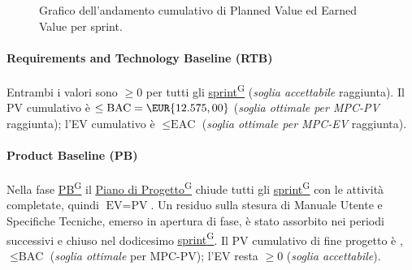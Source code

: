 \documentclass[a4paper,12pt]{article}
\providecommand{\glslink}[2]{\href{https://alittlebyte-19.github.io/Documentazione/glossario.html\#gls-#1}{\underline{#2}\textsuperscript{\scriptsize G}}}
\begin{document}
\begin{figure}[H]
\centering
{}
\caption{Grafico dell'andamento cumulativo di Planned Value ed Earned Value per sprint.}
\end{figure}

\paragraph*{Requirements and Technology Baseline (RTB)} Entrambi i valori sono $\geq 0$ per tutti gli \glslink{sprint}{sprint} (\emph{soglia accettabile} raggiunta). Il PV cumulativo è $\leq \text{BAC} = \EUR{12.575,00}$ (\emph{soglia ottimale per MPC-PV} raggiunta); l'EV cumulativo è $\leq \text{EAC}$ (\emph{soglia ottimale per MPC-EV} raggiunta).

\paragraph*{Product Baseline (PB)} Nella fase \glslink{pb-product-baseline}{PB} il \glslink{piano-di-progetto}{Piano di Progetto} chiude tutti gli \glslink{sprint}{sprint} con le attività completate, quindi $\text{EV} = \text{PV}$. Un residuo sulla stesura di Manuale Utente e Specifiche Tecniche, emerso in apertura di fase, è stato assorbito nei periodi successivi e chiuso nel dodicesimo \glslink{sprint}{sprint}. Il PV cumulativo di fine progetto è , $\leq \text{BAC}$ (\emph{soglia ottimale} per MPC-PV); l'EV resta $\geq 0$ (\emph{soglia accettabile}).
\end{document}
